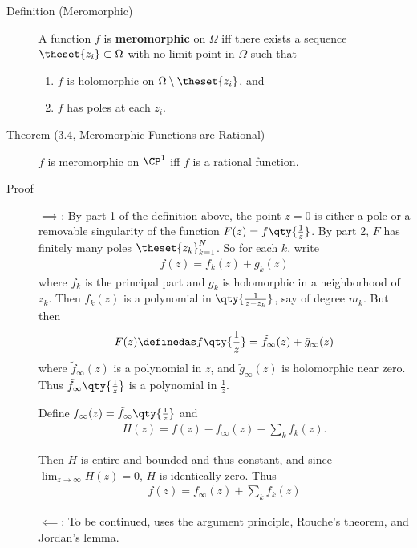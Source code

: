 \begin{description}
\item[Definition (Meromorphic)]
A function \(f\) is \textbf{meromorphic} on \(\Omega\) iff there exists
a sequence \(\theset{z_i} \subset \Omega\) with no limit point in
\(\Omega\) such that

\begin{enumerate}
\def\labelenumi{\arabic{enumi}.}
\tightlist
\item
  \(f\) is holomorphic on \(\Omega \setminus\theset{z_i}\), and
\item
  \(f\) has poles at each \(z_i\).
\end{enumerate}
\item[Theorem (3.4, Meromorphic Functions are Rational)]
\(f\) is meromorphic on \(\CP^1\) iff \(f\) is a rational function.
\item[Proof]
\hfill

\(\implies\): By part 1 of the definition above, the point \(z=0\) is
either a pole or a removable singularity of the function
\(F(z) = f\qty{\frac 1 z}\). By part 2, \(F\) has finitely many poles
\(\theset{z_k}_{k=1}^N\). So for each \(k\), write
\begin{align*}
f(z) = f_k(z) + g_k(z)
\end{align*} where \(f_k\) is the principal part and \(g_k\) is
holomorphic in a neighborhood of \(z_k\). Then \(f_k(z)\) is a
polynomial in \(\qty{\frac 1 {z-z_k}}\), say of degree \(m_k\). But then
\begin{align*}
F(z) \definedas f\qty{\frac 1 z} = \tilde f_\infty(z) + \tilde g_\infty(z)
\end{align*} where \(\tilde f_\infty(z)\) is a polynomial in \(z\), and
\(\tilde g_\infty(z)\) is holomorphic near zero. Thus
\(\tilde f_\infty\qty{\frac 1 z}\) is a polynomial in \(\frac 1 z\).

Define \(f_\infty(z) = \tilde f_\infty \qty{\frac 1 z}\) and
\begin{align*}
H(z) = f(z) - f_\infty (z) - \sum_k f_k(z)
.\end{align*}

Then \(H\) is entire and bounded and thus constant, and since
\(\lim_{z\to \infty} H(z) = 0\), \(H\) is identically zero. Thus
\begin{align*}
f(z) = f_\infty(z) + \sum_k f_k(z)
\end{align*}

\hfill\break

\(\impliedby\): To be continued, uses the argument principle, Rouche's
theorem, and Jordan's lemma.
\end{description}

